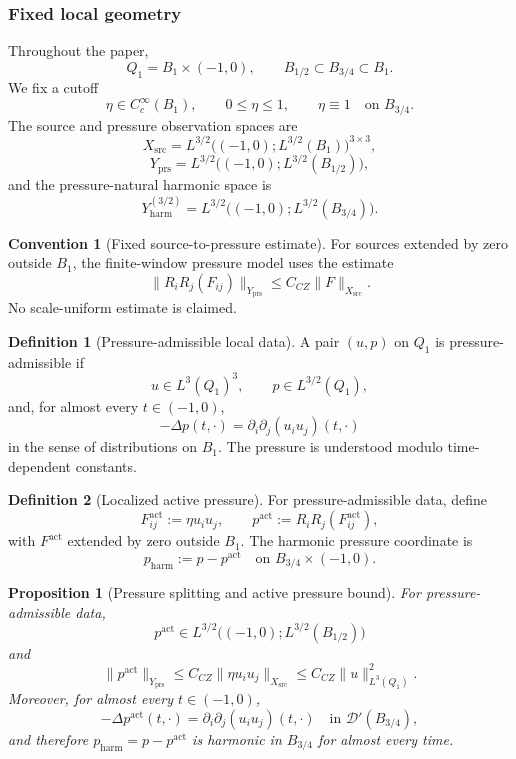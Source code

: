 \documentclass[11pt]{article}
\numberwithin{equation}{section}
\newtheorem{proposition}[proposition]{Proposition}
\theoremstyle{definition}
\newtheorem{definition}[definition]{Definition}
\newtheorem{convention}[convention]{Convention}
\theoremstyle{remark}
\newcommand{\prs}{\mathrm{prs}}
\newcommand{\harm}{\mathrm{harm}}
\newcommand{\src}{\mathrm{src}}
\newcommand{\act}{\mathrm{act}}
\newcommand{\Xsrc}{X_{\src}}
\newcommand{\Yprs}{Y_{\prs}}
\newcommand{\Yharm}{Y_{\harm}^{(3/2)}}
\newcommand{\Qone}{Q_1}
\begin{document}
\subsubsection{Fixed local geometry}

Throughout the paper,
\[
    \Qone=B_1\times(-1,0),
    \qquad
    B_{1/2}\subset B_{3/4}\subset B_1.
\]
We fix a cutoff
\[
    \eta\in C_c^\infty(B_1),
    \qquad
    0\le \eta\le 1,
    \qquad
    \eta\equiv1\quad\text{on }B_{3/4}.
\]
The source and pressure observation spaces are
\[
    \Xsrc
    =
    L^{3/2}\bigl((-1,0);L^{3/2}(B_1)\bigr)^{3\times3},
\]
\[
    \Yprs
    =
    L^{3/2}\bigl((-1,0);L^{3/2}(B_{1/2})\bigr),
\]
and the pressure-natural harmonic space is
\[
    \Yharm
    =
    L^{3/2}\bigl((-1,0);L^{3/2}(B_{3/4})\bigr).
\]

\begin{convention}[Fixed source-to-pressure estimate]
\label{ps:conv:source-to-pressure}
For sources extended by zero outside \(B_1\), the finite-window pressure model
uses the estimate
\[
    \|R_iR_j(F_{ij})\|_{\Yprs}
    \le
    C_{CZ}\|F\|_{\Xsrc}.
\]
No scale-uniform estimate is claimed.
\end{convention}

\begin{definition}[Pressure-admissible local data]
\label{ps:def:pressure-admissible-data}
A pair \((u,p)\) on \(\Qone\) is pressure-admissible if
\[
    u\in L^3(\Qone)^3,
    \qquad
    p\in L^{3/2}(\Qone),
\]
and, for almost every \(t\in(-1,0)\),
\[
    -\Delta p(t,\cdot)
    =
    \partial_i\partial_j(u_i u_j)(t,\cdot)
\]
in the sense of distributions on \(B_1\).  The pressure is understood modulo
time-dependent constants.
\end{definition}

\begin{definition}[Localized active pressure]
\label{ps:def:localized-active-pressure}
For pressure-admissible data, define
\[
    F^{\act}_{ij}:=\eta u_i u_j,
    \qquad
    p^{\act}:=R_iR_j(F^{\act}_{ij}),
\]
with \(F^{\act}\) extended by zero outside \(B_1\).  The harmonic pressure
coordinate is
\[
    p_{\harm}:=p-p^{\act}
    \quad\text{on }B_{3/4}\times(-1,0).
\]
\end{definition}

\begin{proposition}[Pressure splitting and active pressure bound]
\label{ps:prop:pressure-splitting-working}
For pressure-admissible data,
\[
    p^{\act}\in L^{3/2}\bigl((-1,0);L^{3/2}(B_{1/2})\bigr)
\]
and
\[
    \|p^{\act}\|_{\Yprs}
    \le
    C_{CZ}\|\eta u_i u_j\|_{\Xsrc}
    \le
    C_{CZ}\|u\|_{L^3(\Qone)}^2 .
\]
Moreover, for almost every \(t\in(-1,0)\),
\[
    -\Delta p^{\act}(t,\cdot)
    =
    \partial_i\partial_j(u_i u_j)(t,\cdot)
    \quad\text{in }\mathcal D'(B_{3/4}),
\]
and therefore \(p_{\harm}=p-p^{\act}\) is harmonic in \(B_{3/4}\) for almost
every time.
\end{proposition}
\end{document}
